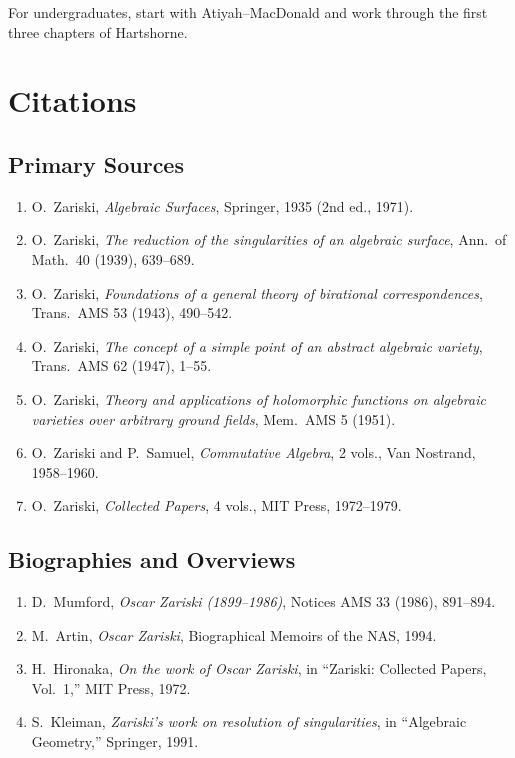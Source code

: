 For undergraduates, start with Atiyah--MacDonald and work through the first three chapters of Hartshorne.

\section{Citations}\subsection*{Primary Sources}
\begin{enumerate}
    \item O.\ Zariski, \textit{Algebraic Surfaces}, Springer, 1935 (2nd ed., 1971).
    \item O.\ Zariski, \textit{The reduction of the singularities of an algebraic surface}, Ann.\ of Math.\ 40 (1939), 639--689.
    \item O.\ Zariski, \textit{Foundations of a general theory of birational correspondences}, Trans.\ AMS 53 (1943), 490--542.
    \item O.\ Zariski, \textit{The concept of a simple point of an abstract algebraic variety}, Trans.\ AMS 62 (1947), 1--55.
    \item O.\ Zariski, \textit{Theory and applications of holomorphic functions on algebraic varieties over arbitrary ground fields}, Mem.\ AMS 5 (1951).
    \item O.\ Zariski and P.\ Samuel, \textit{Commutative Algebra}, 2 vols., Van Nostrand, 1958--1960.
    \item O.\ Zariski, \textit{Collected Papers}, 4 vols., MIT Press, 1972--1979.
\end{enumerate}

\subsection*{Biographies and Overviews}
\begin{enumerate}
    \item D.\ Mumford, \textit{Oscar Zariski (1899--1986)}, Notices AMS 33 (1986), 891--894.
    \item M.\ Artin, \textit{Oscar Zariski}, Biographical Memoirs of the NAS, 1994.
    \item H.\ Hironaka, \textit{On the work of Oscar Zariski}, in ``Zariski: Collected Papers, Vol.\ 1,'' MIT Press, 1972.
    \item S.\ Kleiman, \textit{Zariski's work on resolution of singularities}, in ``Algebraic Geometry,'' Springer, 1991.
\end{enumerate}

